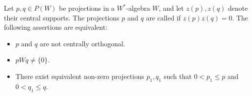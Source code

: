 Let $p, q \in P(W)$ be projections in a $W^*$-algebra $W$, and let $z(p), z(q)$ denote their central supports. The projections $p$ and $q$ are called  if $z(p) z(q) = 0$. The following assertions are equivalent:
\begin{itemize}
\item[(a)] $p$ and $q$ are not centrally orthogonal.
\item[(b)] $pWq \neq \{0\}$.
\item[(c)] There exist equivalent non-zero projections $p_1, q_1$ such that $0 < p_1 \leq p$ and $0 < q_1 \leq q$.
\end{itemize}
